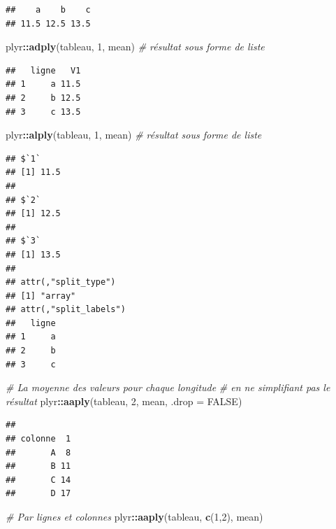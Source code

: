 \documentclass[
  11pt,
]{book}
\newenvironment{Shaded}{\begin{snugshade}}{\end{snugshade}}
\newcommand{\CommentTok}[1]{\textcolor[rgb]{0.56,0.35,0.01}{\textit{#1}}}
\newcommand{\DataTypeTok}[1]{\textcolor[rgb]{0.13,0.29,0.53}{#1}}
\newcommand{\DecValTok}[1]{\textcolor[rgb]{0.00,0.00,0.81}{#1}}
\newcommand{\KeywordTok}[1]{\textcolor[rgb]{0.13,0.29,0.53}{\textbf{#1}}}
\newcommand{\NormalTok}[1]{#1}
\newcommand{\OperatorTok}[1]{\textcolor[rgb]{0.81,0.36,0.00}{\textbf{#1}}}
\newcommand{\OtherTok}[1]{\textcolor[rgb]{0.56,0.35,0.01}{#1}}
\numberwithin{equation}{section}
\numberwithin{countremarque}{section}
\begin{document}
\begin{lstlisting}
##    a    b    c 
## 11.5 12.5 13.5
\end{lstlisting}

\begin{Shaded}
\begin{Highlighting}[]
\NormalTok{plyr}\OperatorTok{::}\KeywordTok{adply}\NormalTok{(tableau, }\DecValTok{1}\NormalTok{, mean) }\CommentTok{\# résultat sous forme de liste}
\end{Highlighting}
\end{Shaded}

\begin{lstlisting}
##   ligne   V1
## 1     a 11.5
## 2     b 12.5
## 3     c 13.5
\end{lstlisting}

\begin{Shaded}
\begin{Highlighting}[]
\NormalTok{plyr}\OperatorTok{::}\KeywordTok{alply}\NormalTok{(tableau, }\DecValTok{1}\NormalTok{, mean) }\CommentTok{\# résultat sous forme de liste}
\end{Highlighting}
\end{Shaded}

\begin{lstlisting}
## $`1`
## [1] 11.5
## 
## $`2`
## [1] 12.5
## 
## $`3`
## [1] 13.5
## 
## attr(,"split_type")
## [1] "array"
## attr(,"split_labels")
##   ligne
## 1     a
## 2     b
## 3     c
\end{lstlisting}

\begin{Shaded}
\begin{Highlighting}[]
\CommentTok{\# La moyenne des valeurs pour chaque longitude}
\CommentTok{\# en ne simplifiant pas le résultat}
\NormalTok{plyr}\OperatorTok{::}\KeywordTok{aaply}\NormalTok{(tableau, }\DecValTok{2}\NormalTok{, mean, }\DataTypeTok{.drop =} \OtherTok{FALSE}\NormalTok{)}
\end{Highlighting}
\end{Shaded}

\begin{lstlisting}
##        
## colonne  1
##       A  8
##       B 11
##       C 14
##       D 17
\end{lstlisting}

\begin{Shaded}
\begin{Highlighting}[]
\CommentTok{\# Par lignes et colonnes}
\NormalTok{plyr}\OperatorTok{::}\KeywordTok{aaply}\NormalTok{(tableau, }\KeywordTok{c}\NormalTok{(}\DecValTok{1}\NormalTok{,}\DecValTok{2}\NormalTok{), mean)}
\end{Highlighting}
\end{Shaded}
\end{document}

